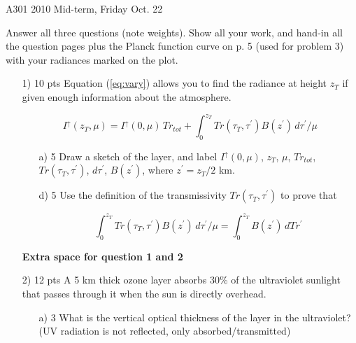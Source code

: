 \documentclass[12pt]{article}
\begin{document}
\begin{center}
  A301 2010 Mid-term,  Friday Oct. 22
\end{center}

Answer all three questions (note weights).  Show all your work, and hand-in 
all the question  pages plus
the Planck function curve on p. 5 (used for problem 3) with your radiances
marked on the plot.


\begin{enumerate}


\item[1) 10 pts] Equation (\ref{eq:vary}) allows you to find the radiance at height $z_T$
if given enough information about the atmosphere.  

\begin{equation*}
  \tag{24}
I^\uparrow (z_T,\mu) = I^\uparrow (0,\mu) \, Tr_{tot} + \int_0^{z_T} Tr(\tau_T, \tau^\prime) B(z^\prime)\, d\tau^\prime/\mu
\end{equation*}

\begin{enumerate}
\item[a) 5] Draw a  sketch of the layer, and 
label $I^\uparrow (0,\mu)$, $z_T$, $\mu$, $Tr_{tot}$, $Tr(\tau_T,\tau^\prime)$, $d\tau^\prime$,  $B(z^\prime)$,
where $z^\prime= z_T/2$ km.


\item[d) 5] Use the definition of the transmissivity $Tr(\tau_T, \tau^\prime)$ to prove that 

  \begin{equation*}
    \int_0^{z_T} Tr(\tau_T,\tau^\prime) B(z^\prime)\, d\tau^\prime/\mu = \int_0^{z_T} B(z^\prime)\, dTr^\prime
  \end{equation*}

\end{enumerate}

\newpage

\textbf{Extra space for question 1 and 2}

\newpage


\item[2) 12 pts] A 5 km thick ozone layer absorbs 30\% of the ultraviolet sunlight that passes through
it when the sun is directly overhead.

\begin{enumerate}


\item[a) 3] What is the vertical optical thickness of the layer in the ultraviolet?
(UV radiation is not reflected, only absorbed/transmitted)


\end{enumerate}
\end{enumerate}
\end{document}
